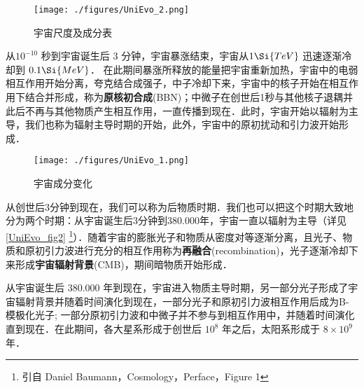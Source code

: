 \begin{figure}[ht]
\centering
\texttt{[image: ./figures/UniEvo\_2.png]}
\caption{宇宙尺度及成分表} \label{UniEvo_fig1}
\end{figure}

从$10^{-10}$ 秒到宇宙诞生后 3 分钟，宇宙暴涨结束，宇宙从$1\Si{TeV}$ 迅速逐渐冷却到 $0.1 \Si{MeV}$． 在此期间暴涨所释放的能量把宇宙重新加热，宇宙中的电弱相互作用开始分离，夸克结合成强子，中子冷却下来，宇宙中的核子开始在相互作用下结合并形成，称为\textbf{原核初合成}(BBN)；中微子在创世后1秒与其他核子退耦并此后不再与其他物质产生相互作用，一直传播到现在．此时，宇宙开始以辐射为主导，我们也称为辐射主导时期的开始，此外，宇宙中的原初扰动和引力波开始形成．

\begin{figure}[ht]
\centering
\texttt{[image: ./figures/UniEvo\_1.png]}
\caption{宇宙成分变化} \label{UniEvo_fig2}
\end{figure}

从创世后3分钟到现在，我们可以称为后物质时期．我们也可以把这个时期大致地分为两个时期：从宇宙诞生后3分钟到380.000年，宇宙一直以辐射为主导（详见\autoref{UniEvo_fig2} \footnote{引自 Daniel Baumann，Cosmology，Perface，Figure 1}）．随着宇宙的膨胀光子和物质从密度对等逐渐分离，且光子、物质和原初引力波进行充分的相互作用称为\textbf{再融合}(recombination)，光子逐渐冷却下来形成\textbf{宇宙辐射背景}(CMB)，期间暗物质开始形成．

从宇宙诞生后 $380.000$ 年到现在，宇宙进入物质主导时期，另一部分光子形成了宇宙辐射背景并随着时间演化到现在，一部分光子和原初引力波相互作用后成为B-模极化光子; 一部分原初引力波和中微子并不参与到相互作用中，并随着时间演化直到现在．在此期间，各大星系形成于创世后 $10^8$ 年之后，太阳系形成于 $8\times 10^9$ 年．
